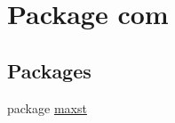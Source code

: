 \hypertarget{namespacecom}{}\section{Package com}
\label{namespacecom}
\subsection*{Packages}
\begin{DoxyCompactItemize}
\item 
package \hyperlink{namespacecom_1_1maxst}{maxst}
\end{DoxyCompactItemize}
